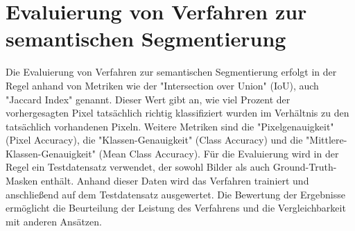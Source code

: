 \section{Evaluierung von Verfahren zur semantischen Segmentierung}
Die Evaluierung von Verfahren zur semantischen Segmentierung erfolgt in der
Regel anhand von Metriken wie der "Intersection over Union" (IoU), auch
"Jaccard Index" genannt. Dieser Wert gibt an, wie viel Prozent der
vorhergesagten Pixel tatsächlich richtig klassifiziert wurden im Verhältnis zu
den tatsächlich vorhandenen Pixeln. Weitere Metriken sind die
"Pixelgenauigkeit" (Pixel Accuracy), die "Klassen-Genauigkeit" (Class Accuracy)
und die "Mittlere-Klassen-Genauigkeit" (Mean Class Accuracy). Für die
Evaluierung wird in der Regel ein Testdatensatz verwendet, der sowohl Bilder
als auch Ground-Truth-Masken enthält. Anhand dieser Daten wird das Verfahren
trainiert und anschließend auf dem Testdatensatz ausgewertet. Die Bewertung der
Ergebnisse ermöglicht die Beurteilung der Leistung des Verfahrens und die
Vergleichbarkeit mit anderen Ansätzen. \